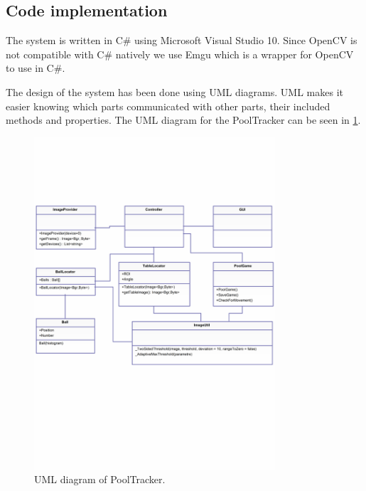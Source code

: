 \subsection{Code implementation}
The system is written in C\# using Microsoft Visual Studio 10. Since OpenCV\cite{opencv} is not compatible with C\# natively we use Emgu\cite{emgu} which is a wrapper for OpenCV to use in C\#. 

The design of the system has been done using UML diagrams. UML makes it easier knowing which parts communicated with other parts, their included methods and properties. The UML diagram for the PoolTracker can be seen in \ref{fig:uml}.

\begin{figure}[H]
\begin{center}
\leavevmode
\includegraphics[width=0.8\textwidth]{images/UML}
\end{center}
\caption{UML diagram of PoolTracker.}
\label{fig:uml}
\end{figure}
